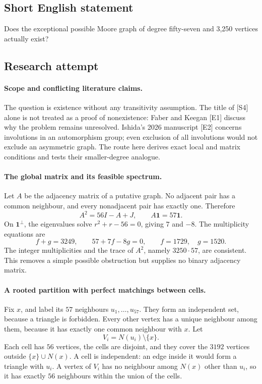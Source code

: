 \documentclass[11pt,a4paper]{article}
\begin{document}
\subsection{Short English statement}

Does the exceptional possible Moore graph of degree fifty-seven and 3,250 vertices actually exist?

\subsection{Research attempt}

\paragraph{Scope and conflicting literature claims.}
The question is existence without any transitivity assumption. The
title of [S4] alone is not treated as a proof of nonexistence: Faber
and Keegan [E1] discuss why the problem remains unresolved. Ishida's
2026 manuscript [E2] concerns involutions in an automorphism group;
even exclusion of all involutions would not exclude an asymmetric
graph. The route here derives exact local and matrix conditions and
tests their smaller-degree analogue.

\paragraph{The global matrix and its feasible spectrum.}
Let $A$ be the adjacency matrix of a putative graph. No adjacent pair
has a common neighbour, and every nonadjacent pair has exactly one.
Therefore
\[
                   A^2=56I-A+J,
                   \qquad A\mathbf1=57\mathbf1.
\]
On $\mathbf1^\perp$, the eigenvalues solve $r^2+r-56=0$,
giving $7$ and $-8$. The multiplicity equations are
\[
                 f+g=3249,\qquad57+7f-8g=0,
                 \qquad f=1729,\quad g=1520.
\]
The integer multiplicities and the trace of $A^2$, namely
$3250\cdot57$, are consistent. This removes a simple possible
obstruction but supplies no binary adjacency matrix.

\paragraph{A rooted partition with perfect matchings between cells.}
Fix $x$, and label its $57$ neighbours $u_1,\ldots,u_{57}$.
They form an independent set, because a triangle is forbidden.
Every other vertex has a unique neighbour among them, because it has
exactly one common neighbour with $x$. Let
\[
                       V_i=N(u_i)\setminus\{x\}.
\]
Each cell has $56$ vertices, the cells are disjoint, and they cover
the $3192$ vertices outside $\{x\}\cup N(x)$. A cell is independent:
an edge inside it would form a triangle with $u_i$. A vertex of
$V_i$ has no neighbour among $N(x)$ other than $u_i$, so it has
exactly $56$ neighbours within the union of the cells.
\end{document}
